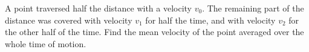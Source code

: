 
\item A point traversed half the distance with a velocity \( v_0 \). The remaining part of the distance was covered with velocity \( v_1 \) for half the time, and with velocity \( v_2 \) for the other half of the time. Find the mean velocity of the point averaged over the whole time of motion.
